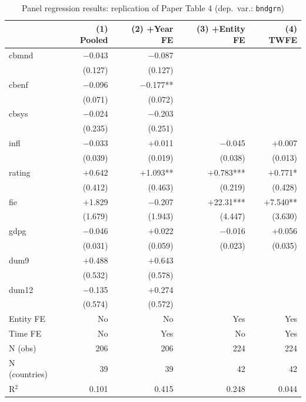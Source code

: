\documentclass[12pt,a4paper]{article}
\begin{document}
\begin{table}[H]
\centering
\caption{Panel regression results: replication of Paper Table 4
  (dep.\ var.: \texttt{bndgrn})}
\label{tab:mainreg}
\begin{tabular}{lrrrr}
\toprule
 & (1) Pooled & (2) +Year FE & (3) +Entity FE & (4) TWFE \\
\midrule
cbmnd  & $-$0.043 & $-$0.087   &          &         \\
       & (0.127)  & (0.127)    &          &         \\
cbenf  & $-$0.096 & $-$0.177** &          &         \\
       & (0.071)  & (0.072)    &          &         \\
cbsys  & $-$0.024 & $-$0.203   &          &         \\
       & (0.235)  & (0.251)    &          &         \\
infl   & $-$0.033 & $+$0.011   & $-$0.045 & $+$0.007 \\
       & (0.039)  & (0.019)    & (0.038)  & (0.013)  \\
rating & $+$0.642 & $+$1.093** & $+$0.783*** & $+$0.771* \\
       & (0.412)  & (0.463)    & (0.219)  & (0.428)  \\
fie    & $+$1.829 & $-$0.207   & $+$22.31*** & $+$7.540** \\
       & (1.679)  & (1.943)    & (4.447)  & (3.630)  \\
gdpg   & $-$0.046 & $+$0.022   & $-$0.016 & $+$0.056 \\
       & (0.031)  & (0.059)    & (0.023)  & (0.035)  \\
dum9   & $+$0.488 & $+$0.643   &          &         \\
       & (0.532)  & (0.578)    &          &         \\
dum12  & $-$0.135 & $+$0.274   &          &         \\
       & (0.574)  & (0.572)    &          &         \\
\midrule
Entity FE & No & No & Yes & Yes \\
Time FE   & No & Yes & No  & Yes \\
\midrule
N (obs)       & 206 & 206 & 224 & 224 \\
N (countries) & 39  & 39  & 42  & 42  \\
R$^2$         & 0.101 & 0.415 & 0.248 & 0.044 \\
\bottomrule
\end{tabular}
\end{table}
\end{document}
